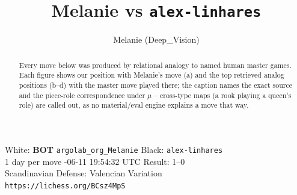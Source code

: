 \documentclass[11pt]{article}
\title{Melanie vs \texttt{alex-linhares}}
\author{Melanie (Deep\_Vision)}
\date{}
\begin{document}
\maketitle
\begin{center}\small
White: \textbf{BOT} \texttt{argolab\_org\_Melanie} \quad Black: \texttt{alex-linhares} \\
1 day per move -06-11 19:54:32 UTC \quad Result: 1--0 \\
Scandinavian Defense: Valencian Variation \\
\texttt{https://lichess.org/BCsz4MpS}
\end{center}
\begin{abstract}Every move below was produced by relational analogy to named human master games. Each figure shows our position with Melanie's move (a) and the top retrieved analog positions (b--d) with the master move played there; the caption names the exact source and the piece-role correspondence under $\mu$ -- cross-type maps (a rook playing a queen's role) are called out, as no material/eval engine explains a move that way.\end{abstract}
\end{document}
